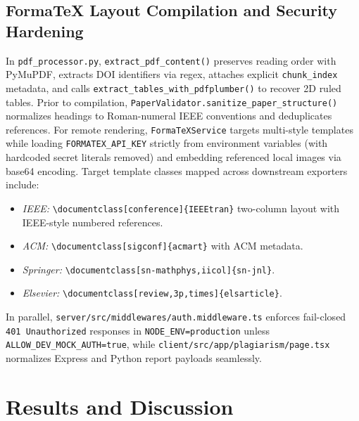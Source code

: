 \documentclass[conference]{IEEEtran}
\begin{document}
\subsection{FormaTeX Layout Compilation and Security Hardening}
In \texttt{pdf\_processor.py}, \texttt{extract\_pdf\_content()} preserves reading order with PyMuPDF, extracts DOI identifiers via regex, attaches explicit \texttt{chunk\_index} metadata, and calls \texttt{extract\_tables\_with\_pdfplumber()} to recover 2D ruled tables. Prior to compilation, \texttt{PaperValidator.sanitize\_paper\_structure()} normalizes headings to Roman-numeral IEEE conventions and deduplicates references. For remote rendering, \texttt{FormaTeXService} targets multi-style templates while loading \texttt{FORMATEX\_API\_KEY} strictly from environment variables (with hardcoded secret literals removed) and embedding referenced local images via base64 encoding. Target template classes mapped across downstream exporters include:
\begin{itemize}
  \item \emph{IEEE:} \texttt{\textbackslash documentclass[conference]\{IEEEtran\}} two-column layout with IEEE-style numbered references.
  \item \emph{ACM:} \texttt{\textbackslash documentclass[sigconf]\{acmart\}} with ACM metadata.
  \item \emph{Springer:} \texttt{\textbackslash documentclass[sn-mathphys,iicol]\{sn-jnl\}}.
  \item \emph{Elsevier:} \texttt{\textbackslash documentclass[review,3p,times]\{elsarticle\}}.
\end{itemize}
In parallel, \texttt{server/src/middlewares/auth.middleware.ts} enforces fail-closed \texttt{401 Unauthorized} responses in \texttt{NODE\_ENV=production} unless \texttt{ALLOW\_DEV\_MOCK\_AUTH=true}, while \texttt{client/src/app/plagiarism/page.tsx} normalizes Express and Python report payloads seamlessly.

\section{Results and Discussion}
\label{sec:results}
\end{document}

